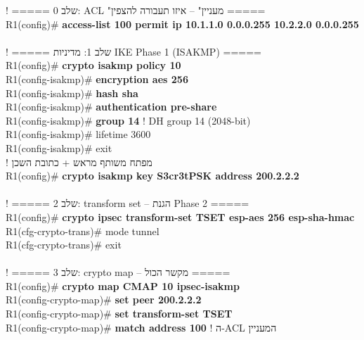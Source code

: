 \documentclass[11pt]{article}
\newcommand{\enLR}[1]{\textenglish{#1}}
\begin{document}
\begin{codebox}\begin{english}\codefont\footnotesize\color{cfg}\setlength{\parindent}{0pt}
\textcolor{ccom}{\texthebrew{! ===== שלב \enLR{0: ACL "}מעניין" – איזו תעבורה להצפין =====}}\\
R1(config)\# \textcolor{cbold}{\textbf{access-list 100 permit ip 10.1.1.0 0.0.0.255 10.2.2.0 0.0.0.255}}\\
~\\
\textcolor{ccom}{\texthebrew{! ===== שלב \enLR{1}: מדיניות \enLR{IKE Phase 1 (ISAKMP)} =====}}\\
R1(config)\# \textcolor{cbold}{\textbf{crypto isakmp policy 10}}\\
R1(config-isakmp)\# \textcolor{cbold}{\textbf{encryption aes 256}}\\
R1(config-isakmp)\# \textcolor{cbold}{\textbf{hash sha}}\\
R1(config-isakmp)\# \textcolor{cbold}{\textbf{authentication pre-share}}\\
R1(config-isakmp)\# \textcolor{cbold}{\textbf{group 14}}                 \textcolor{ccom}{\texthebrew{! \enLR{DH group 14 (2048-bit)}}}\\
R1(config-isakmp)\# lifetime 3600\\
R1(config-isakmp)\# exit\\
\textcolor{ccom}{\texthebrew{! מפתח משותף מראש + כתובת השכן}}\\
R1(config)\# \textcolor{cbold}{\textbf{crypto isakmp key S3cr3tPSK address 200.2.2.2}}\\
~\\
\textcolor{ccom}{\texthebrew{! ===== שלב \enLR{2: transform set} – הגנת \enLR{Phase 2} =====}}\\
R1(config)\# \textcolor{cbold}{\textbf{crypto ipsec transform-set TSET esp-aes 256 esp-sha-hmac}}\\
R1(cfg-crypto-trans)\# mode tunnel\\
R1(cfg-crypto-trans)\# exit\\
~\\
\textcolor{ccom}{\texthebrew{! ===== שלב \enLR{3: crypto map} – מקשר הכול =====}}\\
R1(config)\# \textcolor{cbold}{\textbf{crypto map CMAP 10 ipsec-isakmp}}\\
R1(config-crypto-map)\# \textcolor{cbold}{\textbf{set peer 200.2.2.2}}\\
R1(config-crypto-map)\# \textcolor{cbold}{\textbf{set transform-set TSET}}\\
R1(config-crypto-map)\# \textcolor{cbold}{\textbf{match address 100}}          \textcolor{ccom}{\texthebrew{! ה-\enLR{ACL} המעניין}}\\

\end{english}
\end{codebox}
\end{document}
